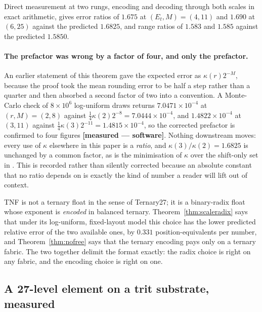 Direct measurement at two rungs, encoding and decoding through both scales in
exact arithmetic, gives error ratios of $1.675$ at $(E_t,M) = (4,11)$ and $1.690$
at $(6,25)$ against the predicted $1.6825$, and range ratios of $1.583$ and
$1.585$ against the predicted $1.5850$.

\paragraph{The prefactor was wrong by a factor of four, and only the prefactor.}
An earlier statement of this theorem gave the expected error as $\kappa(r)2^{-M}$,
because the proof took the mean rounding error to be half a step rather than a
quarter and then absorbed a second factor of two into a convention. A Monte-Carlo
check of $8\times10^{6}$ log-uniform draws returns $7.0471\times10^{-4}$ at
$(r,M)=(2,8)$ against $\tfrac14\kappa(2)2^{-8} = 7.0444\times10^{-4}$, and
$1.4822\times10^{-4}$ at $(3,11)$ against $\tfrac14\kappa(3)2^{-11} =
1.4815\times10^{-4}$, so the corrected prefactor is confirmed to four figures
\textbf{[measured --- software]}. Nothing downstream moves: every use of $\kappa$
elsewhere in this paper is a \emph{ratio}, and $\kappa(3)/\kappa(2) = 1.6825$ is
unchanged by a common factor, as is the minimisation of $\kappa$ over the
shift-only set in . This is recorded rather than
silently corrected because an absolute constant that no ratio depends on is
exactly the kind of number a reader will lift out of context.

\begin{corollary}
TNF is not a ternary float in the sense of Ternary27; it is a binary-radix float
whose exponent is \emph{encoded} in balanced ternary. Theorem~\ref{thm:scaleradix}
says that under its log-uniform, fixed-layout model this choice has the lower
predicted relative error of the two available ones, by $0.331$
position-equivalents per number, and Theorem~\ref{thm:nofree} says that the ternary encoding pays only on a
ternary fabric. The two together delimit the format exactly: the radix choice is
right on any fabric, and the encoding choice is right on one.
\end{corollary}



\subsection{A 27-level element on a trit substrate, measured}
\label{sec:t27block}

